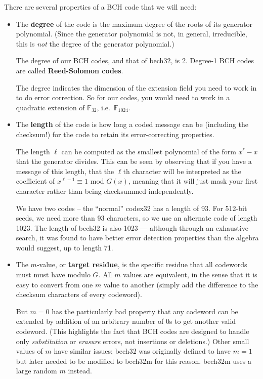 \documentclass[letterpaper]{article}
\newcommand{\fttwo}{\mathbb{F}_{32}}
\newcommand{\ftttwo}{\mathbb{F}_{1024}}
\begin{document}
There are several properties of a BCH code that we will need:
\begin{itemize}
\item The \textbf{degree} of the code is the maximum degree of the roots of
its generator polynomial. (Since the generator polynomial is not, in general,
irreducible, this is \emph{not} the degree of the generator polynomial.)

The degree of our BCH codes, and that of bech32, is 2. Degree-1 BCH codes are
called \textbf{Reed-Solomon codes}.

The degree indicates the dimension of the extension field you need to work
in to do error correction. So for our codes, you would need to work in a
quadratic extension of $\fttwo$, i.e.~$\ftttwo$.

\item The \textbf{length} of the code is how long a coded message can be
(including the checksum!) for the code to retain its error-correcting
properties.

The length $\ell$ can be computed as the smallest polynomial of the form
$x^\ell - x$ that the generator divides. This can be seen by observing
that if you have a message of this length, that the $\ell$th character
will be interpreted as the coefficient of $x^{\ell-1} \equiv 1$ mod $G(x)$,
meaning that it will just mask your first character rather than being
checksummed independently.

We have two codes -- the ``normal'' codex32 has a length of 93. For 512-bit
seeds, we need more than 93 characters, so we use an alternate code of
length 1023. The length of bech32 is also 1023 --- although through
an exhaustive search, it was found to have better error detection properties
than the algebra would suggest, up to length 71.

\item The $m$-value, or \textbf{target residue}, is the specific residue that
all codewords must must have modulo $G$. All $m$ values are equivalent, in
the sense that it is easy to convert from one $m$ value to another (simply
add the difference to the checksum characters of every codeword).

But $m=0$ has the particularly bad property that any codeword can be extended
by addition of an arbitrary number of 0s to get another valid codeword. (This
highlights the fact that BCH codes are designed to handle only \emph{substitution}
or \emph{erasure} errors, not insertions or deletions.) Other small values of
$m$ have similar issues; bech32 was originally defined to have $m=1$ but later
needed to be modified to bech32m for this reason. bech32m uses a large random
$m$ instead.


\end{itemize}
\end{document}
